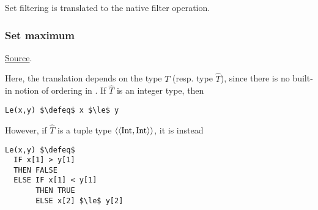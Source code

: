 \begin{mathpar}
\end{mathpar}
Set filtering is translated to the \tlap native filter operation.

\subsubsection{ Set maximum}
\href{https://github.com/saltiniroberto/ssf/blob/7ea6e18093d9da3154b4e396dd435549f687e6b9/high_level/common/pythonic_code_generic.py#L74-L76}{Source}.



\begin{mathpar}
\end{mathpar}
Here, the translation depends on the type $T$ (resp. type $\hat{T}$), since there is no built-in notion of ordering in \tlap{}. If $\hat{T}$ is an integer type, then 
\begin{lstlisting}[language=tla,columns=fullflexible]
Le(x,y) $\defeq$ x $\le$ y
\end{lstlisting}
However, if $\hat{T}$ is a tuple type $\tup{\Int,\Int}$, it is instead 
\begin{lstlisting}[language=tla,columns=fullflexible]
Le(x,y) $\defeq$ 
  IF x[1] > y[1]
  THEN FALSE
  ELSE IF x[1] < y[1]
       THEN TRUE
       ELSE x[2] $\le$ y[2]
\end{lstlisting}

